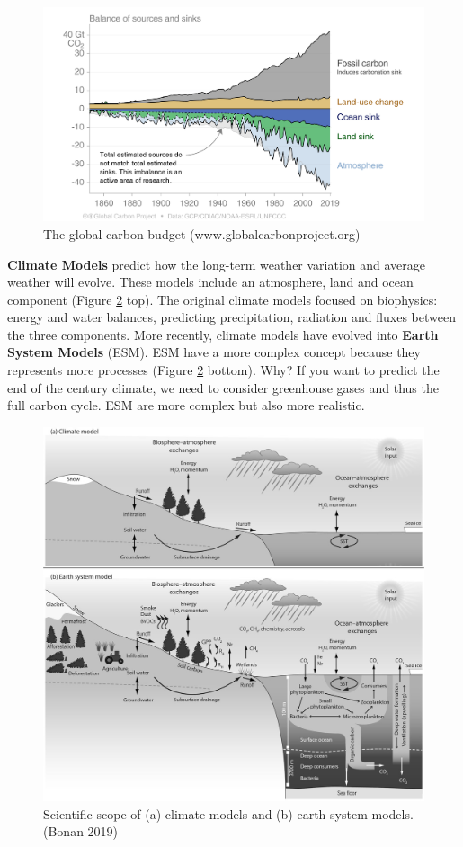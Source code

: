 \documentclass[
  12pt,
  oneside]{book}
\begin{document}
\begin{figure}

{\centering \includegraphics[width=0.8\linewidth]{figures/chap1/carbon_budget} 

}

\caption{The global carbon budget (www.globalcarbonproject.org)}\label{fig:f2}
\end{figure}

\textbf{Climate Models} predict how the long-term weather variation and average weather will evolve. These models include an atmosphere, land and ocean component (Figure \ref{fig:f3} top). The original climate models focused on biophysics: energy and water balances, predicting precipitation, radiation and fluxes between the three components.
More recently, climate models have evolved into \textbf{Earth System Models} (ESM). ESM have a more complex concept because they represents more processes (Figure \ref{fig:f3} bottom). Why? If you want to predict the end of the century climate, we need to consider greenhouse gases and thus the full carbon cycle. ESM are more complex but also more realistic.

\begin{figure}

{\centering \includegraphics[width=0.7\linewidth]{figures/chap1/GCM_ESM} 

}

\caption{Scientific scope of (a) climate models and (b) earth system models. (Bonan 2019)}\label{fig:f3}
\end{figure}
\end{document}
